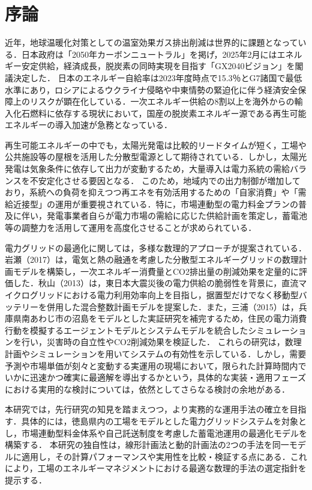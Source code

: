 
\chapter{序論}
近年，地球温暖化対策としての温室効果ガス排出削減は世界的に課題となっている．日本政府は「2050年カーボンニュートラル」を掲げ，2025年2月にはエネルギー安定供給，経済成長，脱炭素の同時実現を目指す「GX2040ビジョン」を閣議決定した． 日本のエネルギー自給率は2023年度時点で15.3％とG7諸国で最低水準にあり，ロシアによるウクライナ侵略や中東情勢の緊迫化に伴う経済安全保障上のリスクが顕在化している．一次エネルギー供給の8割以上を海外からの輸入化石燃料に依存する現状において，国産の脱炭素エネルギー源である再生可能エネルギーの導入加速が急務となっている\cite{a1}．

再生可能エネルギーの中でも，太陽光発電は比較的リードタイムが短く，工場や公共施設等の屋根を活用した分散型電源として期待されている．しかし，太陽光発電は気象条件に依存して出力が変動するため，大量導入は電力系統の需給バランスを不安定化させる要因となる． このため，地域内での出力制御が増加しており，系統への負荷を抑えつつ再エネを有効活用するための「自家消費」や「需給近接型」の運用が重要視されている．特に，市場連動型の電力料金プランの普及に伴い，発電事業者自らが電力市場の需給に応じた供給計画を策定し，蓄電池等の調整力を活用して運用を高度化させることが求められている\cite{a1}．

電力グリッドの最適化に関しては，多様な数理的アプローチが提案されている． 岩瀬（2017）は，電気と熱の融通を考慮した分散型エネルギーグリッドの数理計画モデルを構築し，一次エネルギー消費量とCO2排出量の削減効果を定量的に評価した\cite{a3}．秋山（2013）は，東日本大震災後の電力供給の脆弱性を背景に，直流マイクログリッドにおける電力利用効率向上を目指し，据置型だけでなく移動型バッテリーを併用した混合整数計画モデルを提案した\cite{a4}．また，三浦（2015）は，兵庫県南あわじ市の沼島をモデルとした実証研究を補完するため，住民の電力消費行動を模擬するエージェントモデルとシステムモデルを統合したシミュレーションを行い，災害時の自立性やCO2削減効果を検証した\cite{a5}． これらの研究は，数理計画やシミュレーションを用いてシステムの有効性を示している．しかし，需要予測や市場単価が刻々と変動する実運用の現場において，限られた計算時間内でいかに迅速かつ確実に最適解を導出するかという，具体的な実装・適用フェーズにおける実用的な検討については，依然としてさらなる検討の余地がある．

本研究では，先行研究の知見を踏まえつつ，より実務的な運用手法の確立を目指す．具体的には，徳島県内の工場をモデルとした電力グリッドシステムを対象とし，市場連動型料金体系や自己託送制度を考慮した蓄電池運用の最適化モデルを構築する． 本研究の独自性は，線形計画法と動的計画法の2つの手法を同一モデルに適用し，その計算パフォーマンスや実用性を比較・検証する点にある．これにより，工場のエネルギーマネジメントにおける最適な数理的手法の選定指針を提示する．

